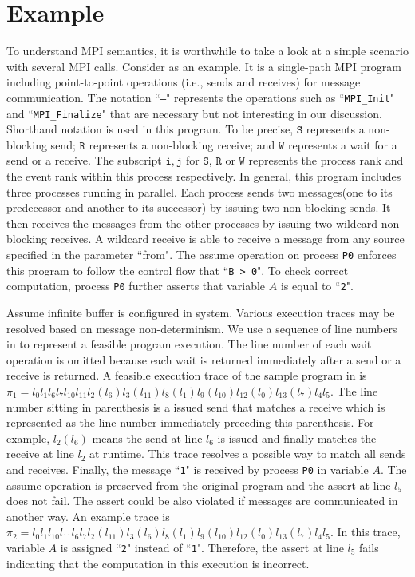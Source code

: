 \section{Example}\label{sec:example}
To understand MPI semantics, it is worthwhile to take a look at a simple scenario with several MPI calls. Consider  as an example. It is a single-path MPI program including point-to-point operations (i.e., sends and receives) for message communication. The notation ``\texttt{---}" represents the operations such as ``\texttt{MPI\_Init}" and ``\texttt{MPI\_Finalize}" that are necessary but not interesting in our discussion. Shorthand notation is used in this program. To be precise, $\mathtt{S}$ represents a non-blocking send; $\mathtt{R}$ represents a non-blocking receive; and $\mathtt{W}$ represents a wait for a send or a receive. The subscript $\mathtt{i,j}$ for $\mathtt{S}$, $\mathtt{R}$ or $\mathtt{W}$ represents the process rank and the event rank within this process respectively.
In general, this program includes three processes running in parallel. Each process sends two messages(one to its predecessor and another to its successor) by issuing two non-blocking sends. It then receives the messages from the other processes by issuing two wildcard non-blocking receives. A wildcard receive is able to receive a message from any source specified in the parameter ``from". The assume operation on process \texttt{P0} enforces this program to follow the control flow that ``\texttt{B > 0}". To check correct computation, process \texttt{P0} further asserts that variable $A$ is equal to ``\texttt{2}".  

Assume infinite buffer is configured in system. Various execution traces may be resolved based on message non-determinism. We use a sequence of line numbers in  to represent a feasible program execution. The line number of each wait operation is omitted because each wait is returned immediately after a send or a receive is returned. A feasible execution trace of the sample program in  is $\pi_1 = l_0l_1l_6l_7l_{10}l_{11}l_2(l_6)l_3(l_{11})l_8(l_1)l_9(l_{10})l_{12}(l_0)l_{13}(l_7)l_4l_5$. The line number sitting in parenthesis is a issued send that matches a receive which is represented as the line number immediately preceding this parenthesis. For example, $l_2(l_6)$ means the send at line $l_6$ is issued and finally matches the receive at line $l_2$ at runtime. This trace resolves a possible way to match all sends and receives. Finally, the message ``\texttt{1}" is received by process \texttt{P0} in variable $A$. The assume operation is preserved from the original program and the assert at line $l_5$ does not fail. The assert could be also violated if messages are communicated in another way. An example trace is $\pi_2 = l_0l_1l_{10}l_{11}l_6l_7l_2(l_{11})l_3(l_6)l_8(l_1)l_9(l_{10})l_{12}(l_0)l_{13}(l_7)l_4l_5$. In this trace, variable $A$ is assigned ``\texttt{2}" instead of ``\texttt{1}". Therefore, the assert at line $l_5$ fails indicating that the computation in this execution is incorrect. 

